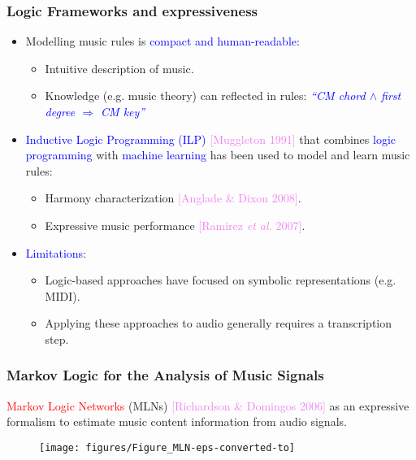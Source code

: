 \documentclass[12pt]{beamer}
\begin{document}
\begin{frame}
\frametitle{Logic Frameworks and expressiveness}
\begin{itemize}
\item Modelling music rules is \textcolor{blue}{compact and human-readable}:
\begin{itemize}
	\item Intuitive description of music.
	\item Knowledge (e.g. music theory) can reflected in rules:  \textcolor{blue}{\textit{``CM chord $\wedge$ first degree $\Rightarrow$ CM key''}}%
\end{itemize}

\item \textcolor{blue}{Inductive Logic Programming (ILP)} \textcolor{violet}{[Muggleton 1991]} that combines \textcolor{blue}{logic programming} with \textcolor{blue}{machine learning} has been used to model and learn music rules:
\begin{itemize}
	\item Harmony characterization \textcolor{violet}{[Anglade \& Dixon 2008]}.
	\item Expressive music performance \textcolor{violet}{[Ramirez \textit{et al.} 2007]}. 
\end{itemize}

\item \textcolor{blue}{Limitations}: 
\begin{itemize}
	\item Logic-based approaches have focused on symbolic representations (e.g. MIDI).
	\item Applying these approaches to audio generally requires a transcription step.
\end{itemize}

\end{itemize}
\end{frame}

\begin{frame}
\frametitle{Markov Logic for the Analysis of Music Signals}

\textcolor{red}{Markov Logic Networks} (MLNs)
\textcolor{violet}{[Richardson \& Domingos 2006]} as an expressive
formalism to estimate music content information from audio signals.
\begin{figure}[htb]
   \centering
   \texttt{[image: figures/Figure\_MLN-eps-converted-to]}
\end{figure}

\end{frame}
\end{document}
